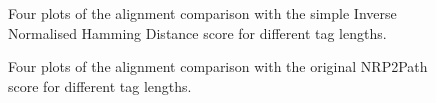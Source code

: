 \documentclass{l4proj}
\begin{document}
\begin{figure} \label{fig:simples}
    \centering

    \caption{Four plots of the alignment comparison with the simple Inverse Normalised Hamming Distance score for different tag lengths.}

    \label{fig:simples}
\end{figure}

\begin{figure} \label{fig:p2ps}
    \centering

    \caption{Four plots of the alignment comparison with the original NRP2Path score for different tag lengths.}

    \label{fig:p2ps}
\end{figure}
\end{document}
